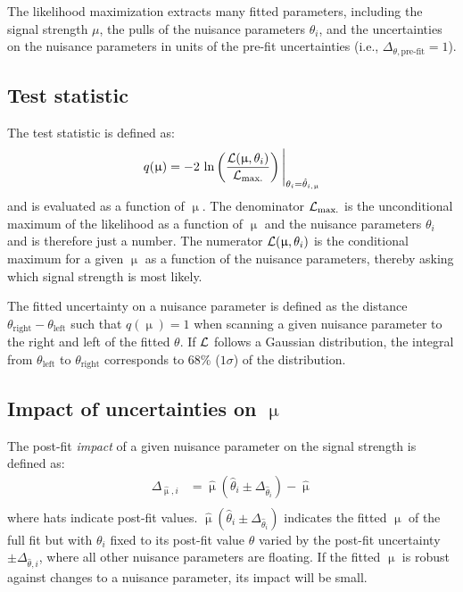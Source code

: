 The likelihood maximization extracts many fitted parameters, including the signal strength $\mu$, the pulls of the nuisance parameters $\theta_i$, and the uncertainties on the nuisance parameters in units of the pre-fit uncertainties (i.e., $\Delta_{\theta,\text{pre-fit}} = 1$).

\subsection{Test statistic}

The test statistic is defined as:
%
\begin{equation}
  \begin{split}
    q(\upmu) &= -2\ \text{ln} \left(\frac{\Lang(\upmu, \theta_i)}{\Lang_\text{max.}}\right) \Bigg\rvert_{\theta_i = \hat{\theta}_{i,\upmu}} \\
  \end{split}
  \label{eqn:test-statistic}
\end{equation}
%
and is evaluated as a function of $\upmu$. The denominator $\mathcal{L}_\text{max.}$ is the unconditional maximum of the likelihood as a function of $\upmu$ and the nuisance parameters $\theta_i$ and is therefore just a number. The numerator $\mathcal{L}(\upmu, \theta_i)$ is the conditional maximum for a given $\upmu$ as a function of the nuisance parameters, thereby asking which signal strength is most likely.

The fitted uncertainty on a nuisance parameter is defined as the distance $\theta_\text{right} - \theta_\text{left}$ such that $q(\upmu) = 1$ when scanning a given nuisance parameter to the right and left of the fitted $\theta$. If $\mathcal{L}$ follows a Gaussian distribution, the integral from $\theta_\text{left}$ to $\theta_\text{right}$ corresponds to 68\% ($1\sigma$) of the distribution.

\subsection{Impact of uncertainties on $\upmu$}

The post-fit \textit{impact} of a given nuisance parameter on the signal strength is defined as:
%
\begin{equation}
  \begin{split}
    \Delta_{\hat{\upmu}, i} &= \hat{\upmu}\left(\hat{\theta}_i \pm \Delta_{\hat{\theta}_i}\right) - \hat{\upmu} \\
  \end{split}
  \label{eqn:impact}
\end{equation}
%
where hats indicate post-fit values. $\hat{\upmu}\left(\hat{\theta}_i \pm \Delta_{\hat{\theta}_i}\right)$ indicates the fitted $\upmu$ of the full fit but with $\theta_i$ fixed to its post-fit value $\hat{\theta}$ varied by the post-fit uncertainty $\pm\Delta_{\hat{\theta}, i}$, where all other nuisance parameters are floating. If the fitted $\upmu$ is robust against changes to a nuisance parameter, its impact will be small.

